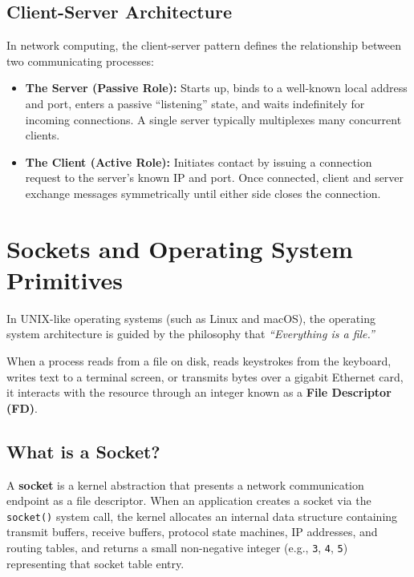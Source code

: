 \subsection{Client-Server Architecture}

In network computing, the client-server pattern defines the relationship between two communicating processes:
\begin{itemize}[leftmargin=1.5em]
    \item \textbf{The Server (Passive Role):} Starts up, binds to a well-known local address and port, enters a passive ``listening'' state, and waits indefinitely for incoming connections. A single server typically multiplexes many concurrent clients.
    \item \textbf{The Client (Active Role):} Initiates contact by issuing a connection request to the server's known IP and port. Once connected, client and server exchange messages symmetrically until either side closes the connection.
\end{itemize}

\section{Sockets and Operating System Primitives}

In UNIX-like operating systems (such as Linux and macOS), the operating system architecture is guided by the philosophy that \textit{``Everything is a file.''} 

When a process reads from a file on disk, reads keystrokes from the keyboard, writes text to a terminal screen, or transmits bytes over a gigabit Ethernet card, it interacts with the resource through an integer known as a \textbf{File Descriptor (FD)}.

\subsection{What is a Socket?}

A \textbf{socket} is a kernel abstraction that presents a network communication endpoint as a file descriptor. When an application creates a socket via the \texttt{socket()} system call, the kernel allocates an internal data structure containing transmit buffers, receive buffers, protocol state machines, IP addresses, and routing tables, and returns a small non-negative integer (e.g., \texttt{3}, \texttt{4}, \texttt{5}) representing that socket table entry.

